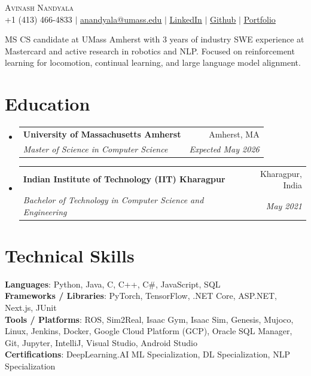 \documentclass[letterpaper,11pt]{article}
\makeatletter
\newcommand{\resumeSubheading}[4]{
  \vspace{-2pt}\item
    \begin{tabular*}{0.97\textwidth}[t]{l@{\extracolsep{\fill}}r}
      \textbf{#1} & #2 \\
      \textit{\small#3} & \textit{\small #4} \\
    \end{tabular*}\vspace{-7pt}
}
\newcommand{\resumeSubHeadingListStart}{\begin{itemize}[leftmargin=0.15in, label={}]}
\newcommand{\resumeSubHeadingListEnd}{\end{itemize}}
\makeatother
\begin{document}

\begin{center}
  {\Huge\textsc{Avinash Nandyala}} \\ \vspace{1pt}
  \small +1 (413) 466-4833 $|$ \href{mailto:anandyala@umass.edu}{\underline{anandyala@umass.edu}} $|$
  \href{https://www.linkedin.com/in/avinash-nandyala-06a88b199/}{\underline{LinkedIn}} $|$
  \href{https://github.com/navinash47}{\underline{Github}} $|$
  \href{https://navinash47.github.io/Portfolio/}{\underline{Portfolio}}
\end{center}

\begin{center}
  \small{MS CS candidate at UMass Amherst with 3 years of industry SWE experience at Mastercard and active research in robotics and NLP. Focused on reinforcement learning for locomotion, continual learning, and large language model alignment.}
\end{center}

\section{Education}
\resumeSubHeadingListStart
  \resumeSubheading
    {University of Massachusetts Amherst}{Amherst, MA}
    {Master of Science in Computer Science}{Expected May 2026}
  \resumeSubheading
    {Indian Institute of Technology (IIT) Kharagpur}{Kharagpur, India}
    {Bachelor of Technology in Computer Science and Engineering}{May 2021}
\resumeSubHeadingListEnd


\section{Technical Skills}
\begin{itemize}[leftmargin=0.15in, label={}]
  \small{\item{
    \textbf{Languages}{: Python, Java, C, C++, C\#, JavaScript, SQL} \\
    \textbf{Frameworks / Libraries}{: PyTorch, TensorFlow, .NET Core, ASP.NET, Next.js, JUnit} \\
    \textbf{Tools / Platforms}{: ROS, Sim2Real, Isaac Gym, Isaac Sim, Genesis, Mujoco, Linux, Jenkins, Docker, Google Cloud Platform (GCP), Oracle SQL Manager, Git, Jupyter, IntelliJ, Visual Studio, Android Studio} \\
    \textbf{Certifications}{: DeepLearning.AI ML Specialization, DL Specialization, NLP Specialization}
  }}
\end{itemize}
\end{document}
